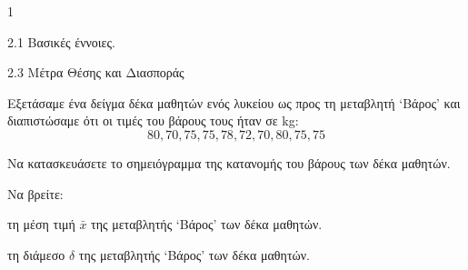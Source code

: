 \begin{ylh}{1}
    \item 2.1 Βασικές έννοιες.
    \item 2.3 Μέτρα Θέσης και Διασποράς
\end{ylh}
Εξετάσαμε ένα δείγμα δέκα μαθητών ενός λυκείου ως προς τη μεταβλητή ‘Βάρος’ και διαπιστώσαμε ότι οι τιμές του βάρους τους ήταν σε kg:
\[
80, 70, 75, 75, 78, 72, 70, 80, 75, 75
\]

\begin{alist}
\item Να κατασκευάσετε το σημειόγραμμα της κατανομής του βάρους των δέκα μαθητών. 
\item Να βρείτε:
\begin{rlist}
\item τη μέση τιμή $\bar{x}$ της μεταβλητής ‘Βάρος’ των δέκα μαθητών. 
\item τη διάμεσο $\delta$ της μεταβλητής ‘Βάρος’ των δέκα μαθητών. 
\end{rlist}
\end{alist}

